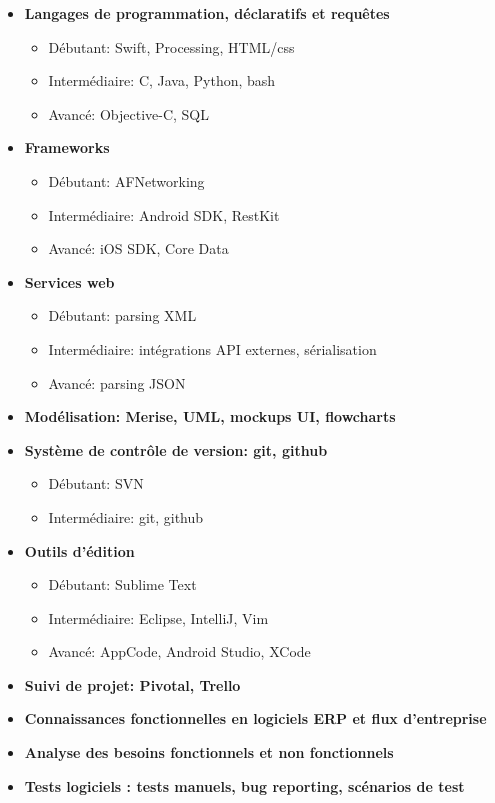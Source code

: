 \documentclass[11pt, a4paper]{moderncv}
\begin{document}
	\begin{itemize}
		\item \textbf{Langages de programmation, déclaratifs et requêtes}
			\begin{itemize}
				\item Débutant: Swift, Processing, HTML/css
				\item Intermédiaire: C, Java, Python, bash
				\item Avancé: Objective-C, SQL
			\end{itemize}
		\item \textbf{Frameworks}
				\begin{itemize}
					\item Débutant: AFNetworking
					\item Intermédiaire: Android SDK, RestKit
					\item Avancé: iOS SDK, Core Data
				\end{itemize}
		\item \textbf{Services web}
			\begin{itemize}
				\item Débutant: parsing XML
				\item Intermédiaire: intégrations API externes, sérialisation
				\item Avancé: parsing JSON
			\end{itemize}
		\item \textbf{Modélisation: Merise, UML, mockups UI, flowcharts}
		\item \textbf{Système de contrôle de version: git, github}
				\begin{itemize}
					\item Débutant: SVN
					\item Intermédiaire: git, github
				\end{itemize}
		\item \textbf{Outils d'édition}
				\begin{itemize}
					\item Débutant: Sublime Text
					\item Intermédiaire: Eclipse, IntelliJ, Vim
					\item Avancé: AppCode, Android Studio, XCode
				\end{itemize}
		\item \textbf{Suivi de projet: Pivotal, Trello}
		\item \textbf{Connaissances fonctionnelles en logiciels ERP et flux d’entreprise}
		\item \textbf{Analyse des besoins fonctionnels et non fonctionnels}
		\item \textbf{Tests logiciels : tests manuels, bug reporting, scénarios de test}
	\end{itemize}
\end{document}
